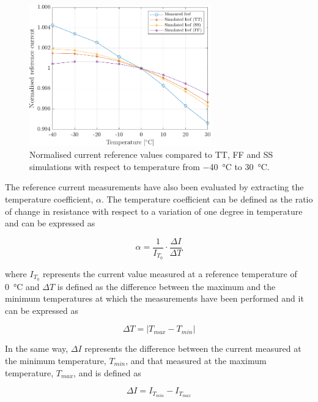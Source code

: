 \begin{figure}[h!]
    \centering
    \includegraphics[width=0.7\textwidth]{Images/chap1/results/BGR_current/BGR_current_normal_Iref.pdf}
    \caption{Normalised current reference values compared to TT, FF and SS simulations with respect to temperature from \SI{-40}{\celsius} to \SI{30}{\celsius}.}
    \label{figBGRplotsnormalised}
\end{figure}

\par
The reference current measurements have also been evaluated by extracting the temperature coefficient, $\alpha$. The temperature coefficient can be defined as the ratio of change in resistance with respect to a variation of one degree in temperature and can be expressed as

\begin{equation}
    \alpha = \frac{1}{I_{T_{0}}} \cdot \frac{\Delta I}{\Delta T}
\end{equation}

\noindent
where $I_{T_{0}}$ represents the current value measured at a reference temperature of \SI{0}{\celsius} and $\Delta T$ is defined as the difference between the maximum and the minimum temperatures at which the measurements have been performed and it can be expressed as

\begin{equation}
    \Delta T = \lvert T_{max} - T_{min} \rvert
\end{equation}

\noindent
In the same way, $\Delta I$ represents the difference between the current measured at the minimum temperature, $T_{min}$, and that measured at the maximum temperature, $T_{max}$, and is defined as 

\begin{equation}
    \Delta I = I_{T_{min}}- I_{T_{max}}
\end{equation}

